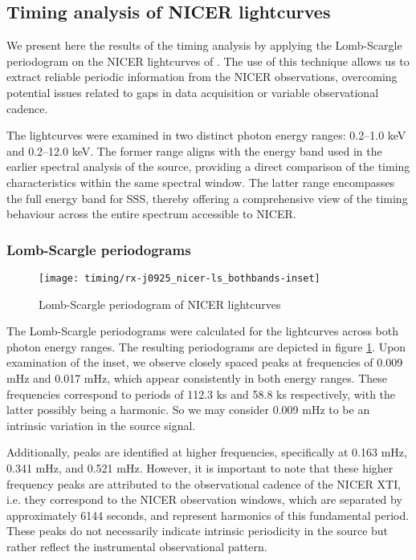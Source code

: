 		\subsection{Timing analysis of NICER lightcurves}		
			We present here the results of the timing analysis by applying the Lomb-Scargle periodogram on the NICER lightcurves of \source. The use of this technique allows us to extract reliable periodic information from the NICER observations, overcoming potential issues related to gaps in data acquisition or variable observational cadence.
			
			The lightcurves were examined in two distinct photon energy ranges: 0.2--1.0 keV and 0.2--12.0 keV. The former range aligns with the energy band used in the earlier spectral analysis of the source, providing a direct comparison of the timing characteristics within the same spectral window. The latter range encompasses the full energy band for SSS, thereby offering a comprehensive view of the timing behaviour across the entire spectrum accessible to NICER.
			
			\subsubsection{Lomb-Scargle periodograms}
				\begin{figure}[h!]
					\centering
					\texttt{[image: timing/rx-j0925\_nicer-ls\_bothbands-inset]}
					\caption{Lomb-Scargle periodogram of NICER lightcurves}
					\label{result:ls-mrvel-nicer}
				\end{figure}
				The Lomb-Scargle periodograms were calculated for the lightcurves across both photon energy ranges. The resulting periodograms are depicted in figure \ref{result:ls-mrvel-nicer}. Upon examination of the inset, we observe closely spaced peaks at frequencies of 0.009 mHz and 0.017 mHz, which appear consistently in both energy ranges. These frequencies correspond to periods of 112.3 ks and 58.8 ks respectively, with the latter possibly being a harmonic. So we may consider 0.009 mHz to be an intrinsic variation in the source signal.
				
				Additionally, peaks are identified at higher frequencies, specifically at 0.163 mHz, 0.341 mHz, and 0.521 mHz. However, it is important to note that these higher frequency peaks are attributed to the observational cadence of the NICER XTI, i.e. they correspond to the NICER observation windows, which are separated by approximately 6144 seconds, and represent harmonics of this fundamental period. These peaks do not necessarily indicate intrinsic periodicity in the source but rather reflect the instrumental observational pattern.
			

